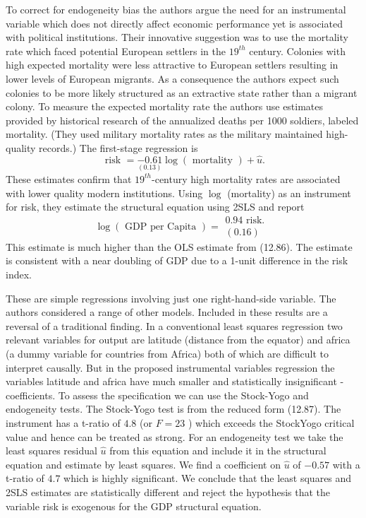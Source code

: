 \documentclass[10pt]{article}
\begin{document}
To correct for endogeneity bias the authors argue the need for an instrumental variable which does not directly affect economic performance yet is associated with political institutions. Their innovative suggestion was to use the mortality rate which faced potential European settlers in the $19^{t h}$ century. Colonies with high expected mortality were less attractive to European settlers resulting in lower levels of European migrants. As a consequence the authors expect such colonies to be more likely structured as an extractive state rather than a migrant colony. To measure the expected mortality rate the authors use estimates provided by historical research of the annualized deaths per 1000 soldiers, labeled mortality. (They used military mortality rates as the military maintained high-quality records.) The first-stage regression is
$$
\text { risk }=\underset{(0.13)}{-0.61} \log (\text { mortality })+\widehat{u} .
$$
These estimates confirm that $19^{t h}$-century high mortality rates are associated with lower quality modern institutions. Using $\log$ (mortality) as an instrument for risk, they estimate the structural equation using 2SLS and report
$$
\log (\text { GDP per Capita })=\begin{gathered}
0.94 \text { risk. } \\
(0.16)
\end{gathered}
$$
This estimate is much higher than the OLS estimate from (12.86). The estimate is consistent with a near doubling of GDP due to a 1-unit difference in the risk index.

These are simple regressions involving just one right-hand-side variable. The authors considered a range of other models. Included in these results are a reversal of a traditional finding. In a conventional least squares regression two relevant variables for output are latitude (distance from the equator) and africa (a dummy variable for countries from Africa) both of which are difficult to interpret causally. But in the proposed instrumental variables regression the variables latitude and africa have much smaller and statistically insignificant - coefficients. To assess the specification we can use the Stock-Yogo and endogeneity tests. The Stock-Yogo test is from the reduced form (12.87). The instrument has a t-ratio of $4.8$ (or $F=23$ ) which exceeds the StockYogo critical value and hence can be treated as strong. For an endogeneity test we take the least squares residual $\widehat{u}$ from this equation and include it in the structural equation and estimate by least squares. We find a coefficient on $\widehat{u}$ of $-0.57$ with a t-ratio of $4.7$ which is highly significant. We conclude that the least squares and 2SLS estimates are statistically different and reject the hypothesis that the variable risk is exogenous for the GDP structural equation.
\end{document}
